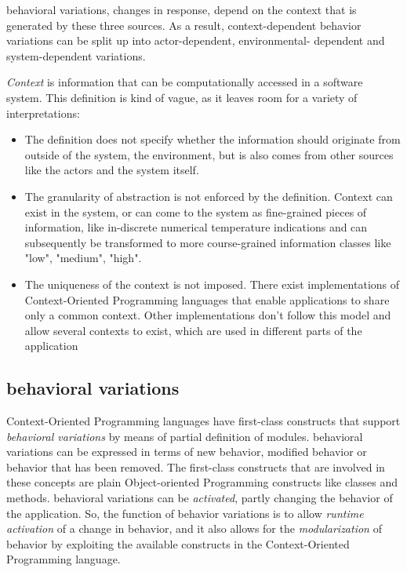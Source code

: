 \documentclass{acm_proc_article-sp}
\begin{document}
behavioral variations, changes in response, depend on the context that is generated by these three sources. As a result, context-dependent behavior variations can be split up into actor-dependent, environmental- dependent and system-dependent variations.

\textit{Context} is information that can be computationally accessed in a software system. This definition is kind of vague, as it leaves room for a variety of interpretations: 
\begin{itemize}
\item The definition does not specify whether the information should originate from outside of the system, the environment, but is also comes from other sources like the actors and the system itself.
\item The granularity of abstraction is not enforced by the definition. Context can exist in the system, or can come to the system as fine-grained pieces of information, like in-discrete numerical temperature indications and can subsequently be transformed to more course-grained information classes like "low", "medium", "high". 
\item The uniqueness of the context is not imposed. There exist implementations of Context-Oriented Programming languages that enable applications to share only a common context. Other implementations don't follow this model and allow several contexts to exist, which are used in different parts of the application \cite{Appeltauer:2009:CCP:1562112.1562118}
\end{itemize}

\subsection{behavioral variations}
\label{sec:behavioral_variations}
Context-Oriented Programming languages have first-class constructs that support \textit{behavioral variations} by means of partial definition of modules. behavioral variations can be expressed in terms of new behavior, modified behavior or behavior that has been removed. The first-class constructs that are involved in these concepts are plain Object-oriented Programming constructs like classes and methods. behavioral variations can be \textit{activated}, partly changing the behavior of the application. So, the function of behavior variations is to allow \textit{runtime activation} of a change in behavior, and it also allows for the \textit{modularization} of behavior by exploiting the available constructs in the Context-Oriented Programming language.    
\end{document}
